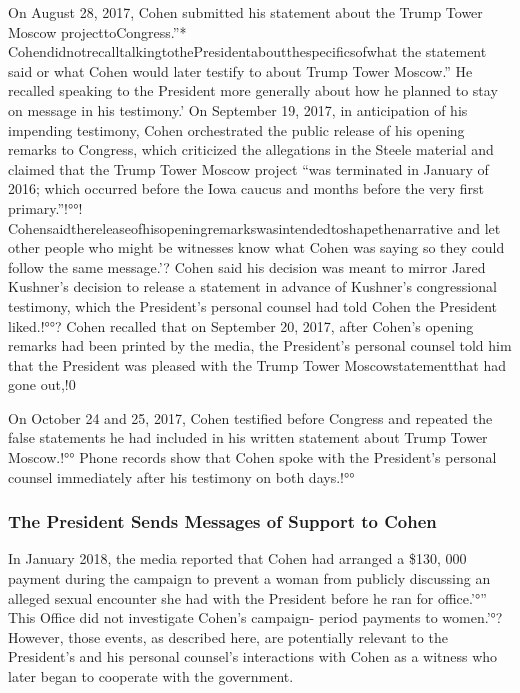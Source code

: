 On August 28, 2017, Cohen submitted his statement about the Trump Tower Moscow projecttoCongress.”* CohendidnotrecalltalkingtothePresidentaboutthespecificsofwhat the statement said or what Cohen would later testify to about Trump Tower Moscow.” He recalled speaking to the President more generally about how he planned to stay on message in his testimony.' On September 19, 2017, in anticipation of his impending testimony, Cohen orchestrated the public release of his opening remarks to Congress, which criticized the allegations in the Steele material and claimed that the Trump Tower Moscow project “was terminated in January of 2016; which occurred before the Iowa caucus and months before the very first primary.”!°°! Cohensaidthereleaseofhisopeningremarkswasintendedtoshapethenarrative and let other people who might be witnesses know what Cohen was saying so they could follow the same message.'? Cohen said his decision was meant to mirror Jared Kushner's decision to release a statement in advance of Kushner's congressional testimony, which the President's personal counsel had told Cohen the President liked.!°°? Cohen recalled that on September 20, 2017, after Cohen's opening remarks had been printed by the media, the President's personal counsel told him that the President was pleased with the Trump Tower Moscowstatementthat had gone out,!0%

On October 24 and 25, 2017, Cohen testified before Congress and repeated the false statements he had included in his written statement about Trump Tower Moscow.!°° Phone records show that Cohen spoke with the President's personal counsel immediately after his testimony on both days.!°°%

\subsubsection{The President Sends Messages of Support to Cohen}

In January 2018, the media reported that Cohen had arranged a \$130, 000 payment during the campaign to prevent a woman from publicly discussing an alleged sexual encounter she had with the President before he ran for office.'°” This Office did not investigate Cohen's campaign- period payments to women.'°? However, those events, as described here, are potentially relevant to the President's and his personal counsel's interactions with Cohen as a witness who later began to cooperate with the government.

